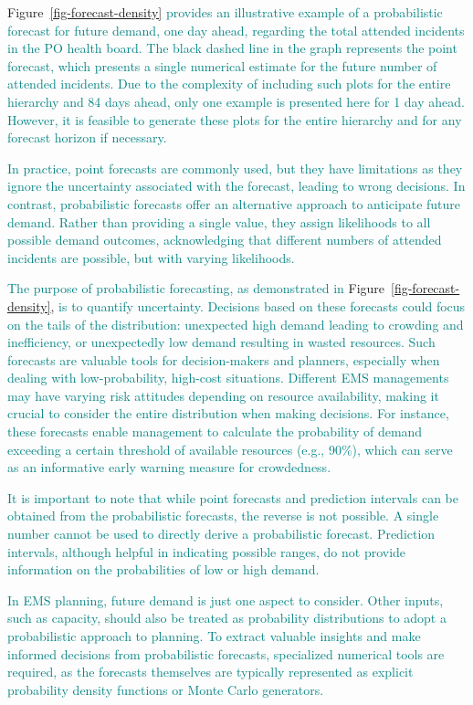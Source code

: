 \documentclass[
  authoryear,
  preprint,
  3p]{elsarticle}
\begin{document}
Figure~\ref{fig-forecast-density}
\textcolor{teal}{provides an illustrative example of a probabilistic forecast for future demand, one day ahead, regarding the total attended incidents in the PO health board. The black dashed line in the graph represents the point forecast, which presents a single numerical estimate for the future number of attended incidents. Due to the complexity of including such plots for the entire hierarchy and 84 days ahead, only one example is presented here for 1 day ahead. However, it is feasible to generate these plots for the entire hierarchy and for any forecast horizon if necessary.}

\textcolor{teal}{In practice, point forecasts are commonly used, but they have limitations as they ignore the uncertainty associated with the forecast, leading to wrong decisions. In contrast, probabilistic forecasts offer an alternative approach to anticipate future demand. Rather than providing a single value, they assign likelihoods to all possible demand outcomes, acknowledging that different numbers of attended incidents are possible, but with varying likelihoods.}

\textcolor{teal}{The purpose of probabilistic forecasting, as demonstrated in}
Figure~\ref{fig-forecast-density},
\textcolor{teal}{is to quantify uncertainty. Decisions based on these forecasts could focus on the tails of the distribution: unexpected high demand leading to crowding and inefficiency, or unexpectedly low demand resulting in wasted resources. Such forecasts are valuable tools for decision-makers and planners, especially when dealing with low-probability, high-cost situations. Different EMS managements may have varying risk attitudes depending on resource availability, making it crucial to consider the entire distribution when making decisions. For instance, these forecasts enable management to calculate the probability of demand exceeding a certain threshold of available resources (e.g., 90\%), which can serve as an informative early warning measure for crowdedness.}

\textcolor{teal}{It is important to note that while point forecasts and prediction intervals can be obtained from the probabilistic forecasts, the reverse is not possible. A single number cannot be used to directly derive a probabilistic forecast. Prediction intervals, although helpful in indicating possible ranges, do not provide information on the probabilities of low or high demand.}

\textcolor{teal}{In EMS planning, future demand is just one aspect to consider. Other inputs, such as capacity, should also be treated as probability distributions to adopt a probabilistic approach to planning. To extract valuable insights and make informed decisions from probabilistic forecasts, specialized numerical tools are required, as the forecasts themselves are typically represented as explicit probability density functions or Monte Carlo generators.}
\end{document}
